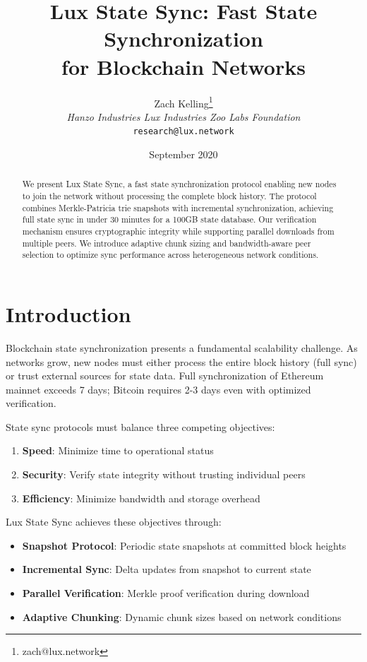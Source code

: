 \documentclass[11pt,a4paper]{article}
\title{Lux State Sync: Fast State Synchronization\\for Blockchain Networks}
\author{Zach Kelling\thanks{zach@lux.network} \\ \textit{Hanzo Industries \quad Lux Industries \quad Zoo Labs Foundation} \\ \texttt{research@lux.network}}
\date{September 2020}
\begin{document}
\maketitle

\begin{abstract}
We present Lux State Sync, a fast state synchronization protocol enabling new nodes to join the network without processing the complete block history. The protocol combines Merkle-Patricia trie snapshots with incremental synchronization, achieving full state sync in under 30 minutes for a 100GB state database. Our verification mechanism ensures cryptographic integrity while supporting parallel downloads from multiple peers. We introduce adaptive chunk sizing and bandwidth-aware peer selection to optimize sync performance across heterogeneous network conditions.
\end{abstract}

\section{Introduction}

Blockchain state synchronization presents a fundamental scalability challenge. As networks grow, new nodes must either process the entire block history (full sync) or trust external sources for state data. Full synchronization of Ethereum mainnet exceeds 7 days; Bitcoin requires 2-3 days even with optimized verification.

State sync protocols must balance three competing objectives:

\begin{enumerate}
    \item \textbf{Speed}: Minimize time to operational status
    \item \textbf{Security}: Verify state integrity without trusting individual peers
    \item \textbf{Efficiency}: Minimize bandwidth and storage overhead
\end{enumerate}

Lux State Sync achieves these objectives through:

\begin{itemize}
    \item \textbf{Snapshot Protocol}: Periodic state snapshots at committed block heights
    \item \textbf{Incremental Sync}: Delta updates from snapshot to current state
    \item \textbf{Parallel Verification}: Merkle proof verification during download
    \item \textbf{Adaptive Chunking}: Dynamic chunk sizes based on network conditions
\end{itemize}
\end{document}
